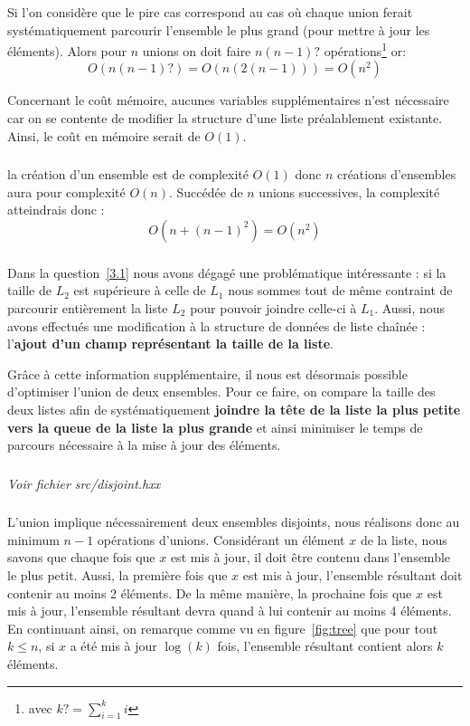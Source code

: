\documentclass[10pt,a4paper]{article}
\begin{document}
{Si l'on considère que le pire cas correspond au cas où chaque union ferait systématiquement parcourir l'ensemble le plus grand (pour mettre à jour les éléments). Alors pour $n$ unions on doit faire $n(n-1)?$ opérations\footnote{avec $k? = \sum\limits_{i=1}^{k}{i}$} or:
$$O(n(n-1)?) =  O(n(2(n-1))) = O(n^2)$$

Concernant le coût mémoire, aucunes variables supplémentaires n'est nécessaire car on se contente de modifier la structure d'une liste préalablement existante. Ainsi, le coût en mémoire serait de $O(1)$.
\subsubsection{}

la création d'un ensemble est de complexité $O(1)$ donc $n$ créations d'ensembles aura pour complexité $O(n)$. Succédée de $n$ unions successives, la complexité atteindrais donc :
$$O(n + (n-1)^2) = O(n^2)$$

\subsubsection{}
Dans la question~\ref{3.1} nous avons dégagé une problématique intéressante : si la taille de $L_{2}$ est supérieure à celle de $L_{1}$ nous sommes tout de même contraint de parcourir entièrement la liste $L_{2}$ pour pouvoir joindre celle-ci à $L_{1}$. Aussi, nous avons effectués une modification à la structure de données de liste chaînée : l'\textbf{ajout d'un champ représentant la taille de la liste}.

Grâce à cette information supplémentaire, il nous est désormais possible d'optimiser l'union de deux ensembles. Pour ce faire, on compare la taille des deux listes afin de systématiquement \textbf{joindre la tête de la liste la plus petite vers la queue de la liste la plus grande} et ainsi minimiser le temps de parcours nécessaire à la mise à jour des éléments.

\subsubsection{}
\textit{Voir fichier src/disjoint.hxx}

\subsubsection{}\label{3.5}
L'union implique nécessairement deux ensembles disjoints, nous réalisons donc au minimum $n-1$ opérations d'unions. Considérant un élément $x$ de la liste, nous savons que chaque fois que $x$ est mis à jour, il doit être contenu dans l'ensemble le plus petit. Aussi, la première fois que $x$ est mis à jour, l'ensemble résultant doit contenir au moins 2 éléments. De la même manière, la prochaine fois que $x$ est mis à jour, l'ensemble résultant devra quand à lui contenir au moins 4 éléments. En continuant ainsi, on remarque comme vu en figure~\ref{fig:tree} que pour tout $k \leq n$, si $x$ a été mis à jour $\log(k)$ fois, l'ensemble résultant contient alors $k$ éléments.

}
\end{document}
